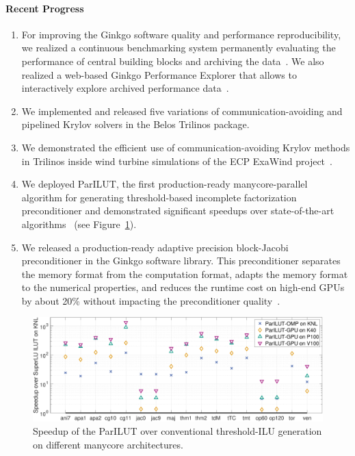 \paragraph{Recent Progress}
\begin{enumerate}
\item 
For improving the Ginkgo software quality and performance reproducibility, we 
realized a continuous benchmarking system permanently evaluating the 
performance of central building blocks and archiving the data~\cite{pasc_anzt}. 
We 
also realized a web-based Ginkgo Performance Explorer that allows to 
interactively explore archived performance 
data~\cite{gpewebpage}.
\item
We implemented and released five variations of communication-avoiding
and pipelined Krylov solvers in the Belos Trilinos package.
\item
We demonstrated the efficient use of communication-avoiding Krylov methods in Trilinos
inside wind turbine simulations of the ECP ExaWind project~\cite{Yamazaki-lowsynch}.
\item 
We deployed ParILUT, the first production-ready manycore-parallel algorithm for 
generating threshold-based incomplete factorization preconditioner and 
demonstrated significant speedups over state-of-the-art 
algorithms~\cite{ipdps_anzt} (see Figure~\ref{fig:ParILUTperf}).
\item
We released a production-ready adaptive precision block-Jacobi preconditioner 
in the Ginkgo software library. This preconditioner separates the memory format 
from the computation format, adapts the memory format to the numerical 
properties, and reduces the runtime cost on high-end GPUs by about 20\% without 
impacting the preconditioner quality~\cite{toms_anzt}.
\end{enumerate}

\begin{figure}[htb]
	\centering
	\includegraphics[width=6in]{projects/2.3.3-MathLibs/2.3.3.13-CLOVER/parilutspeedup}
	\caption{\label{fig:ParILUTperf}Speedup of the ParILUT over conventional 
	threshold-ILU generation on different manycore architectures.}
\end{figure}


